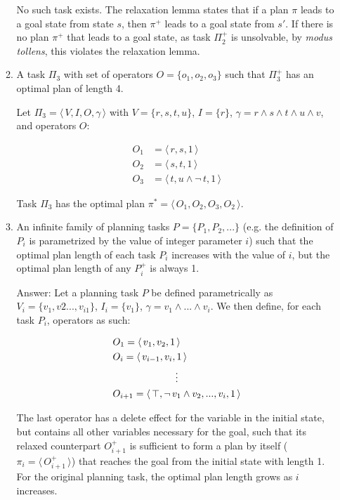 \documentclass[11pt]{article}
\begin{document}
\begin{titlepage}
\begin{enumerate}[label=(\alph*)]
\begin{enumerate}[label=(\roman*)]
No such task exists. The relaxation lemma states that if a plan $\pi$ leads to a goal state from
state $s$, then $\pi^{+}$ leads to a goal state from $s'$. If there is no plan $\pi^{+}$ that leads
to a goal state, as task $\Pi_2^{+}$ is unsolvable, by \textit{modus tollens}, this violates the relaxation lemma.

\item A task $\Pi_3$ with set of operators $O = \{o_1, o_2, o_3\}$ such that $\Pi_3^{+}$
has an optimal plan of length 4. \par
\vspace{5mm}
Let $\Pi_3 = \langle \, V, I, O, \gamma \, \rangle$ with $V = \{ r, s, t, u \}$, $I = \{ r \}$,
$\gamma = r \land s \land t \land u \land v$, and operators $O$:

\begin{align*}
    O_1 &= \langle \, r, s, 1 \, \rangle \\
    O_2 & = \langle \, s, t, 1 \, \rangle \\
    O_3 &= \langle \, t, u \land \neg \, t, 1 \, \rangle
\end{align*}

Task $\Pi_3$ has the optimal plan $\pi^{*} = \langle \, O_1, O_2, O_3, O_2 \, \rangle$.

\item An infinite family of planning tasks $P = \{ P_1, P_2, ... \}$ (e.g. the definition of $P_i$ is
parametrized by the value of integer parameter $i$) such that the optimal plan length of each task
$P_i$ increases with the value of $i$, but the optimal plan length of any $P_i^{+}$ is always 1. \par
\vspace{5mm}
Answer: Let a planning task $P$ be defined parametrically as $V_i = \{ v_1, v2 ..., v_{i1} \}$, $I_i = \{ v_1 \}$,
$\gamma = v_1 \land ... \land v_i$. We then define, for each task $P_i$, operators as such:

\begin{align*}
    & O_{1} = \langle \, v_1, v_2, 1 \, \rangle \\
    & O_{i} = \langle \, v_{i - 1}, v_i, 1 \, \rangle \\
    \omit\span\omit\hfil\vdots\hfil \\
    & O_{i+1} = \langle \, \top, \neg \, v_1 \land v_2, ..., v_i, 1  \, \rangle
\end{align*}

The last operator has a delete effect for the variable in the initial state, but contains all other
variables necessary for the goal, such that its relaxed counterpart $O_{i+1}^+$ is sufficient to form
a plan by itself ($\pi_i = \langle \, O_{i+1}^+ \, \rangle$) that reaches the goal from the initial state with length 1. For the original planning task, the optimal plan length grows as $i$
increases.


\end{enumerate}
\end{enumerate}
\end{titlepage}
\end{document}
